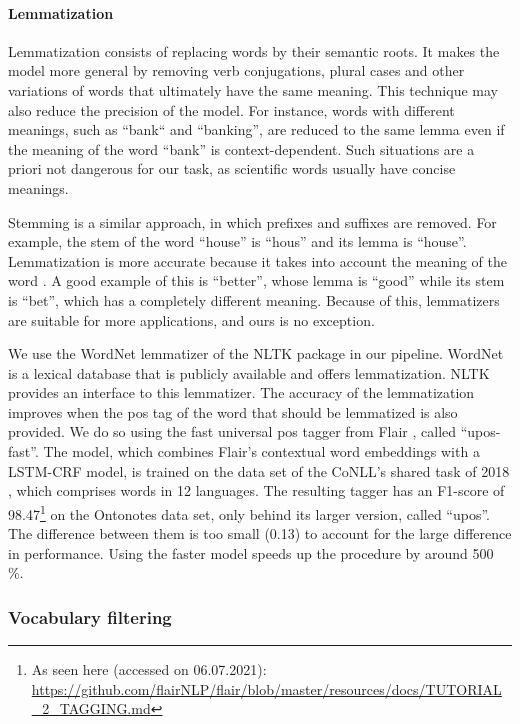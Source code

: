 \paragraph{Lemmatization} \mbox{}

Lemmatization consists of replacing words by their semantic roots. It makes the model more general by removing verb conjugations, plural cases and other variations of words that ultimately have the same meaning. This technique may also reduce the precision of the model. For instance, words with different meanings, such as ``bank`` and ``banking'', are reduced to the same lemma even if the meaning of the word ``bank'' is context-dependent. Such situations are a priori not dangerous for our task, as scientific words usually have concise meanings.

Stemming is a similar approach, in which prefixes and suffixes are removed. For example, the stem of the word ``house'' is ``hous'' and its lemma is ``house''. Lemmatization is more accurate because it takes into account the meaning of the word \cite{hapke2019natural}. A good example of this is ``better'', whose lemma is ``good'' while its stem is ``bet'', which has a completely different meaning. Because of this, lemmatizers are suitable for more applications, and ours is no exception.

We use the WordNet lemmatizer of the NLTK package in our pipeline. WordNet \cite{fellbaum2010wordnet} is a lexical database that is publicly available and offers lemmatization. NLTK provides an interface to this lemmatizer. The accuracy of the lemmatization improves when the \acrfull{pos} tag of the word that should be lemmatized is also provided. We do so using the fast universal \acrshort{pos} tagger from Flair \cite{akbik2019flair}, called ``upos-fast''. The model, which combines Flair's contextual word embeddings \cite{akbik2018contextual} with a LSTM-CRF model, is trained on the data set of the CoNLL's shared task of 2018 \cite{zeman2018conll}, which comprises words in 12 languages. The resulting tagger has an F1-score of 98.47\footnote{As seen here (accessed on 06.07.2021): \url{https://github.com/flairNLP/flair/blob/master/resources/docs/TUTORIAL_2_TAGGING.md}} on the Ontonotes data set, only behind its larger version, called ``upos''. The difference between them is too small (0.13) to account for the large difference in performance. Using the faster model speeds up the procedure by around 500 \%.

\subsubsection{Vocabulary filtering} \label{vocab_filtering}

